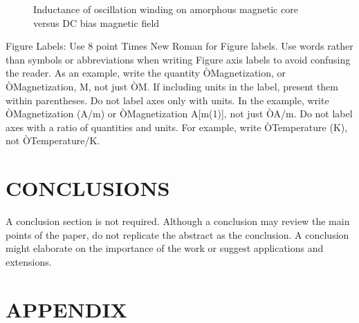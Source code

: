 \documentclass[letterpaper, 10 pt, conference]{ieeeconf}  %
\begin{document}
	
	\begin{figure}[thpb]
		\centering
		\caption{Inductance of oscillation winding on amorphous
			magnetic core versus DC bias magnetic field}
		\label{figurelabel}
	\end{figure}
	
	
	Figure Labels: Use 8 point Times New Roman for Figure labels. Use words rather than symbols or abbreviations when writing Figure axis labels to avoid confusing the reader. As an example, write the quantity ÒMagnetization, or ÒMagnetization, M, not just ÒM. If including units in the label, present them within parentheses. Do not label axes only with units. In the example, write ÒMagnetization (A/m) or ÒMagnetization {A[m(1)]}, not just ÒA/m. Do not label axes with a ratio of quantities and units. For example, write ÒTemperature (K), not ÒTemperature/K.
	
	\section{CONCLUSIONS}
	
	A conclusion section is not required. Although a conclusion may review the main points of the paper, do not replicate the abstract as the conclusion. A conclusion might elaborate on the importance of the work or suggest applications and extensions. 
	
	\addtolength{\textheight}{-12cm}   %
	
	
	
	
	
	
	
	\section*{APPENDIX}
	
\end{document}
